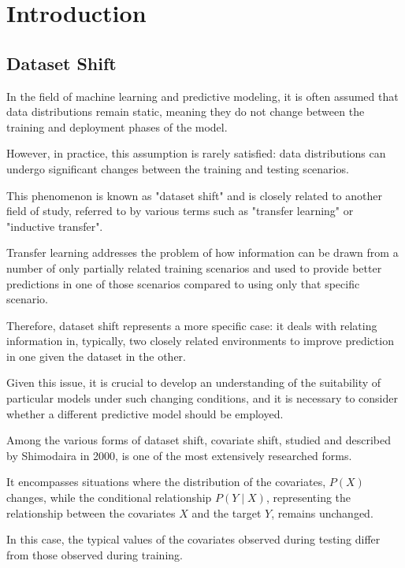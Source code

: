 \chapter{Introduction}


\section{Dataset Shift}

In the field of machine learning and predictive modeling, it is often assumed that data distributions remain static, meaning they do not change between the training and deployment phases of the model.

However, in practice, this assumption is rarely satisfied: data distributions can undergo significant changes between the training and testing scenarios.
	
\vspace{0.3cm}
	This phenomenon is known as "dataset shift" and is closely related to another field of study, referred to by various terms such as "transfer learning" or "inductive transfer".
    
    Transfer learning addresses the problem of how information can be drawn from a number of only partially related training scenarios and used to provide better predictions in one of those scenarios compared to using only that specific scenario.
    
    Therefore, dataset shift represents a more specific case: it deals with relating information in, typically, two closely related environments to improve prediction in one given the dataset in the other.
	
\vspace{0.3cm}
	Given this issue, it is crucial to develop an understanding of the suitability of particular models under such changing conditions, and it is necessary to consider whether a different predictive model should be employed.
	
\vspace{0.3cm}
	Among the various forms of dataset shift, covariate shift, studied and described by Shimodaira in 2000, is one of the most extensively researched forms.
    
    It encompasses situations where the distribution of the covariates, $P(X)$ changes, while the conditional relationship $P(Y \mid X)$, representing the relationship between the covariates $X$ and the target $Y$, remains unchanged.
    
    In this case, the typical values of the covariates observed during testing differ from those observed during training.
	
